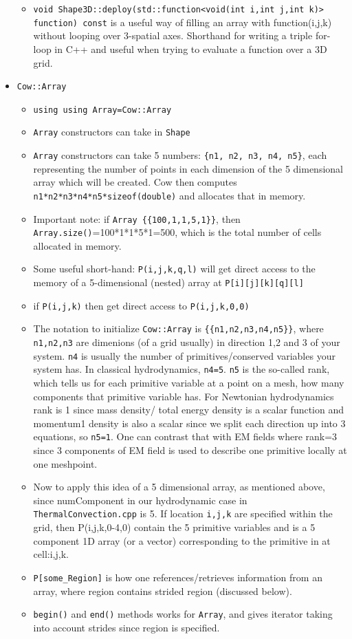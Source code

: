 \documentclass{article}
\begin{document}
\begin{itemize}
\begin{itemize}
		\item \texttt{void Shape3D::deploy(std::function<void(int i,int j,int k)> function) const} is a useful way of filling an array with function(i,j,k) without looping over 3-spatial axes. Shorthand for writing a triple for-loop in C++ and useful when trying to evaluate a function over a 3D grid.
	\end{itemize}
	\item \texttt{Cow::Array}
	\begin{itemize}
		\item \texttt{using using Array=Cow::Array}
		\item \texttt{Array} constructors can take in \texttt{Shape}
		\item \texttt{Array} constructors can take 5 numbers: \texttt{\{n1, n2, n3, n4, n5\}}, each representing the number of points in each dimension of the 5 dimensional array which will be created. Cow then computes \texttt{n1*n2*n3*n4*n5*sizeof(double)} and allocates that in memory.
		\item Important note: if \texttt{Array \{\{100,1,1,5,1\}\}}, then \texttt{Array.size()}=100*1*1*5*1=500, which is the total number of cells allocated in memory.
		\item Some useful short-hand: \texttt{P(i,j,k,q,l)} will get direct access to the memory of a 5-dimensional (nested) array at \texttt{P[i][j][k][q][l]}
		\item if \texttt{P(i,j,k)} then get direct access to \texttt{P(i,j,k,0,0)}
		\item The notation to initialize \texttt{Cow::Array} is \texttt{\{\{n1,n2,n3,n4,n5\}\}}, where \texttt{n1,n2,n3} are dimenions (of a grid usually) in direction 1,2 and 3 of your system. \texttt{n4} is usually the number of primitives/conserved variables your system has. In classical hydrodynamics, \texttt{n4=5}. \texttt{n5} is the so-called rank, which tells us for each primitive variable at a point on a mesh, how many components that primitive variable has. For Newtonian hydrodynamics rank is 1 since mass density/ total energy density is a scalar function and momentum1 density is also a scalar since we split each direction up into 3 equations, so \texttt{n5=1}. One can contrast that with EM fields where rank=3 since 3 components of EM field is used to describe one primitive locally at one meshpoint.
		\item Now to apply this idea of a 5 dimensional array, as mentioned above, since numComponent in our hydrodynamic case in \texttt{ThermalConvection.cpp} is 5. If location \texttt{i,j,k} are specified within the grid, then P(i,j,k,0-4,0) contain the 5 primitive variables and is a 5 component 1D array (or a vector) corresponding to the primitive in at cell:i,j,k.
		\item \texttt{P[some\_Region]} is how one references/retrieves information from an array, where region contains strided region (discussed below).
		\item \texttt{begin()} and \texttt{end()} methods works for \texttt{Array}, and gives iterator taking into account strides since region is specified.
		


\end{itemize}
\end{itemize}
\end{document}
